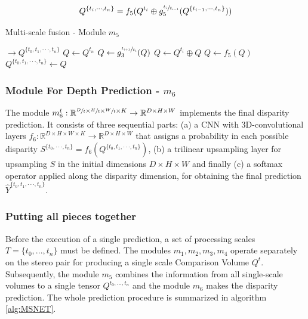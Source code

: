 \documentclass[runningheads]{llncs}
\begin{document}
\begin{equation} \label{eq:two_scale_fusion}
Q^{ \{ t_i, \cdot \cdot \cdot, t_{n} \} } = f_5(Q^{t_i} \oplus g_5^{\sfrac{t_i}{t_{i-1}} }(Q^{ \{ t_{i-1}, \cdot \cdot \cdot, t_n \} }))
\end{equation}

\begin{algorithm}
\caption{Multi-scale fusion - Module $m_5$}\label{alg:multi_scale_fusion}
\begin{algorithmic}[1]
 $\rightarrow Q^{\{t_0, t_1, \cdot \cdot \cdot, t_n\}}$ 
\State $Q \gets Q^{t_n}$ 
\State $Q \gets g_3^{\sfrac{ t_{i+1} }{ t_i } }(Q)$ 
\State $Q \gets Q^{t_i} \oplus Q$ 
\State $Q \gets f_5(Q)$ 
\EndFor
\State \Return $Q^{\{t_0, t_1, \cdot \cdot \cdot, t_n\}} \gets Q$ 
\EndProcedure
\end{algorithmic}
\end{algorithm}


\subsubsection{Module For Depth Prediction - $m_6$}

The module $m_6^t: \mathbb{R}^{\sfrac{D}{t} \times \sfrac{H}{t} \times \sfrac{W}{t} \times K} \rightarrow \mathbb{R}^{D \times H \times W}$ implements the final disparity prediction. It consists of three sequential parts: (a) a CNN with 3D-convolutional layers $f_6: \mathbb{R}^{D \times H \times W \times K} \rightarrow \mathbb{R}^{D \times H \times W}$ that assigns a probability in each possible disparity $S^{\{ t_0, \cdot \cdot \cdot, t_n \}} = f_6(Q^{\{t_0, t_1, \cdot \cdot \cdot, t_n\}})$, (b) a trilinear upsampling layer for upsampling $S$ in the initial dimensions $D \times H \times W$ and finally (c) a softmax operator applied along the disparity dimension, for obtaining the final prediction $\hat{Y}^{\{t_0, t_1, \cdot \cdot \cdot, t_n\}}$.

\subsubsection{Putting all pieces together}

Before the execution of a single prediction, a set of processing scales $T = \{t_0, ..., t_n\}$ must be defined. The modules $m_1, m_2, m_3, m_4$ operate separately on the stereo pair for producing a single scale Comparison Volume $Q^t$. Subsequently, the module $m_5$ combines the information from all single-scale volumes to a single tensor $Q^{t_0, ..., t_n}$ and the module $m_6$ makes the disparity prediction. The whole prediction procedure is summarized in algorithm \ref{alg:MSNET}.
\end{document}
